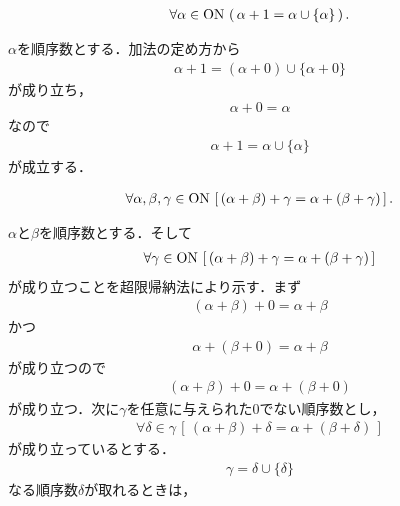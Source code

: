	\begin{screen}
		\begin{thm}
			\begin{align}
				\forall \alpha \in \mathrm{ON}\, \left(\, \alpha + 1 = \alpha \cup \{\alpha\}\, \right).
			\end{align}
		\end{thm}
	\end{screen}
	
	\begin{sketch}
		$\alpha$を順序数とする．加法の定め方から
		\begin{align}
			\alpha + 1 = (\alpha + 0) \cup \{\alpha + 0\}
		\end{align}
		が成り立ち，
		\begin{align}
			\alpha + 0 = \alpha
		\end{align}
		なので
		\begin{align}
			\alpha + 1 = \alpha \cup \{\alpha\}
		\end{align}
		が成立する．
		\QED
	\end{sketch}
	
	\begin{screen}
		\begin{thm}[加法は結合的]
			\begin{align}
				\forall \alpha,\beta,\gamma \in \mathrm{ON}\, \left[\, (\alpha + \beta) + \gamma = \alpha + (\beta + \gamma)\, \right].
			\end{align}
		\end{thm}
	\end{screen}
	
	\begin{sketch}
		$\alpha$と$\beta$を順序数とする．そして
		\begin{align}
			\forall \gamma \in \mathrm{ON}\, \left[\, (\alpha + \beta) + \gamma = \alpha + (\beta + \gamma)\, \right]
		\end{align}
		が成り立つことを超限帰納法により示す．まず
		\begin{align}
			(\alpha + \beta) + 0 = \alpha + \beta
		\end{align}
		かつ
		\begin{align}
			\alpha + (\beta + 0) = \alpha + \beta
		\end{align}
		が成り立つので
		\begin{align}
			(\alpha + \beta) + 0 = \alpha + (\beta + 0)
		\end{align}
		が成り立つ．次に$\gamma$を任意に与えられた$0$でない順序数とし，
		\begin{align}
			\forall \delta \in \gamma\, \left[\, (\alpha + \beta) + \delta = \alpha + (\beta + \delta)\, \right]
		\end{align}
		が成り立っているとする．
		\begin{align}
			\gamma = \delta \cup \{\delta\}
		\end{align}
		なる順序数$\delta$が取れるときは，
		
	\end{sketch}
	
